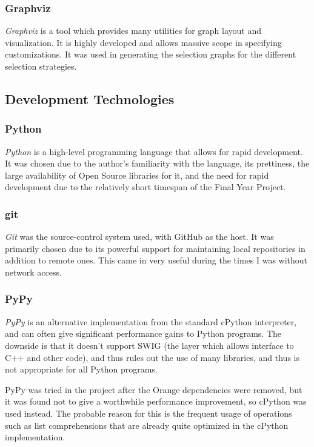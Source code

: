 \documentclass[a4paper,11pt]{report}
\begin{document}
\subsubsection*{Graphviz}
\emph{Graphviz} \citep{prog:graphviz} is a tool which provides many utilities for graph layout and visualization. It is highly developed and allows massive scope in specifying customizations. It was used in generating the selection graphs for the different selection strategies. 

\subsection{Development Technologies}

\subsubsection*{Python}
\emph{Python} \citep{prog:python} is a high-level programming language that allows for rapid development. It was chosen due to the author's familiarity with the language, its prettiness, the large availability of Open Source libraries for it, and the need for rapid development due to the relatively short timespan of the Final Year Project.

\subsubsection*{git}
\emph{Git} \citep{prog:git} was the source-control system used, with GitHub as the host. It was primarily chosen due to its powerful support for maintaining local repositories in addition to remote ones. This came in very useful during the times I was without network access.

\subsubsection*{PyPy}
\emph{PyPy} \citep{prog:pypy} is an alternative implementation from the standard cPython interpreter, and can often give significant performance gains to Python programs. The downside is that it doesn't support SWIG (the layer which allows interface to C++ and other code), and thus rules out the use of many libraries, and thus is not appropriate for all Python programs.

PyPy was tried in the project after the Orange dependencies were removed, but it was found not to give a worthwhile performance improvement, so cPython was used instead. The probable reason for this is the frequent usage of operations such as list comprehensions that are already quite optimized in the cPython implementation.
\end{document}

